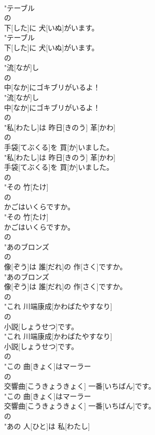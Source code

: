 \documentclass[8pt]{extreport}
\begin{document}
\begin{CJK}{UTF8}{min}
\\	"テーブル
\\	の
\\	下[した]に 犬[いぬ]がいます。
\\	"テーブル
\\	下[した]に 犬[いぬ]がいます。
\\	の
\\	"流[なが]し
\\	の
\\	中[なか]にゴキブリがいるよ！
\\	"流[なが]し
\\	中[なか]にゴキブリがいるよ！
\\	の
\\	"私[わたし]は 昨日[きのう] 革[かわ]
\\	の
\\	手袋[てぶくる]を 買[か]いました。
\\	"私[わたし]は 昨日[きのう] 革[かわ]
\\	手袋[てぶくる]を 買[か]いました。
\\	の
\\	"その 竹[たけ]
\\	の
\\	かごはいくらですか。
\\	"その 竹[たけ]
\\	かごはいくらですか。
\\	の
\\	"あのブロンズ
\\	の
\\	像[ぞう]は 誰[だれ]の 作[さく]ですか。
\\	"あのブロンズ
\\	像[ぞう]は 誰[だれ]の 作[さく]ですか。
\\	の
\\	"これ 川端康成[かわばたやすなり]
\\	の
\\	小説[しょうせつ]です。
\\	"これ 川端康成[かわばたやすなり]
\\	小説[しょうせつ]です。
\\	の
\\	"この 曲[きょく]はマーラー
\\	の
\\	交響曲[こうきょうきょく] 一番[いちばん]です。
\\	"この 曲[きょく]はマーラー
\\	交響曲[こうきょうきょく] 一番[いちばん]です。
\\	の
\\	"あの 人[ひと]は  私[わたし]

\end{CJK}
\end{document}
